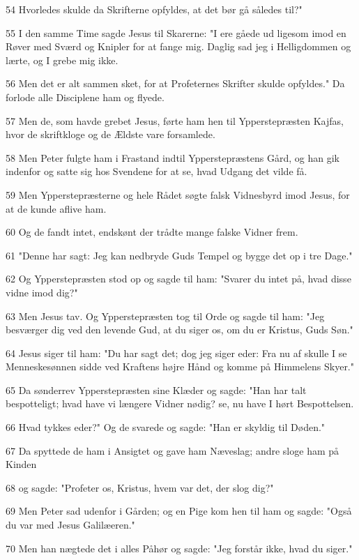 \par 54 Hvorledes skulde da Skrifterne opfyldes, at det bør gå således til?"
\par 55 I den samme Time sagde Jesus til Skarerne: "I ere gåede ud ligesom imod en Røver med Sværd og Knipler for at fange mig. Daglig sad jeg i Helligdommen og lærte, og I grebe mig ikke.
\par 56 Men det er alt sammen sket, for at Profeternes Skrifter skulde opfyldes." Da forlode alle Disciplene ham og flyede.
\par 57 Men de, som havde grebet Jesus, førte ham hen til Ypperstepræsten Kajfas, hvor de skriftkloge og de Ældste vare forsamlede.
\par 58 Men Peter fulgte ham i Frastand indtil Ypperstepræstens Gård, og han gik indenfor og satte sig hos Svendene for at se, hvad Udgang det vilde få.
\par 59 Men Ypperstepræsterne og hele Rådet søgte falsk Vidnesbyrd imod Jesus, for at de kunde aflive ham.
\par 60 Og de fandt intet, endskønt der trådte mange falske Vidner frem.
\par 61 "Denne har sagt: Jeg kan nedbryde Guds Tempel og bygge det op i tre Dage."
\par 62 Og Ypperstepræsten stod op og sagde til ham: "Svarer du intet på, hvad disse vidne imod dig?"
\par 63 Men Jesus tav. Og Ypperstepræsten tog til Orde og sagde til ham: "Jeg besværger dig ved den levende Gud, at du siger os, om du er Kristus, Guds Søn."
\par 64 Jesus siger til ham: "Du har sagt det; dog jeg siger eder: Fra nu af skulle I se Menneskesønnen sidde ved Kraftens højre Hånd og komme på Himmelens Skyer."
\par 65 Da sønderrev Ypperstepræsten sine Klæder og sagde: "Han har talt bespotteligt; hvad have vi længere Vidner nødig? se, nu have I hørt Bespottelsen.
\par 66 Hvad tykkes eder?" Og de svarede og sagde: "Han er skyldig til Døden."
\par 67 Da spyttede de ham i Ansigtet og gave ham Næveslag; andre sloge ham på Kinden
\par 68 og sagde: "Profeter os, Kristus, hvem var det, der slog dig?"
\par 69 Men Peter sad udenfor i Gården; og en Pige kom hen til ham og sagde: "Også du var med Jesus Galilæeren."
\par 70 Men han nægtede det i alles Påhør og sagde: "Jeg forstår ikke, hvad du siger."
